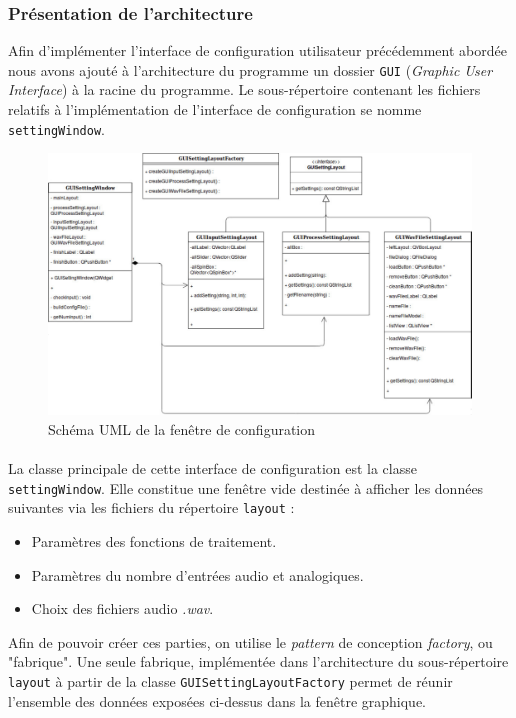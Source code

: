  \subsubsection{Présentation de l'architecture}
 Afin d'implémenter l'interface de configuration utilisateur
 précédemment abordée nous avons ajouté à l'architecture du programme
 un dossier \verb!GUI! (\textit{Graphic User Interface}) à la racine
 du programme.  Le sous-répertoire contenant les fichiers relatifs à
 l'implémentation de l'interface de configuration se nomme
 \verb!settingWindow!.
 
 \begin{figure}[H]
  \centering
  \includegraphics[scale=0.3]{assets/umlSettingWindow.png}
  \caption{Schéma UML de la fenêtre de configuration}
  \label{schéma global}
 \end{figure}
 
 \paragraph{}
 La classe principale de cette interface de configuration est la
 classe \verb!settingWindow!. Elle constitue une fenêtre vide destinée
 à afficher les données suivantes via les fichiers du répertoire
 \verb!layout! :
 \begin{itemize}
  \item Paramètres des fonctions de traitement.
  \item Paramètres du nombre d'entrées audio et analogiques.
  \item Choix des fichiers audio \textit{.wav}.
 \end{itemize}
 Afin de pouvoir créer ces parties, on utilise le \textit{pattern} de
 conception \textit{factory}, ou "fabrique". Une seule fabrique,
 implémentée dans l'architecture du sous-répertoire \verb!layout! à
 partir de la classe \verb!GUISettingLayoutFactory! permet de réunir
 l'ensemble des données exposées ci-dessus dans la fenêtre graphique.
